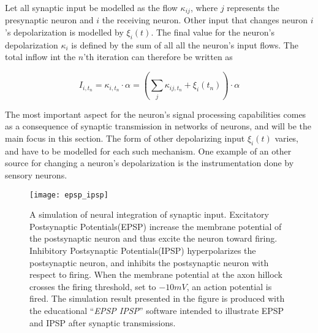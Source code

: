 	Let all synaptic input be modelled as the flow $\kappa_{ij}$, where $j$ represents the presynaptic neuron and $i$ the receiving neuron.
	Other input that changes neuron $i$'s depolarization is modelled by $\xi_i(t)$.
	The final value for the neuron's depolarization $\kappa_i$ is defined by the sum of all all the neuron's input flows.
	The total inflow int the $n$'th iteration can therefore be written as

		\begin{equation}
			I_{i, t_n} = \kappa_{i,t_n} \cdot \alpha = \left( \sum_{j} \kappa_{ij, t_n} + \xi_i(t_n) \right) \cdot \alpha
			\label{eqSynapticIntegrationForKANN}
		\end{equation}

	The most important aspect for the neuron's signal processing capabilities comes as a consequence of synaptic transmission in networks of neurons, and will be the main focus in this section.
	The form of other depolarizing input $\xi_i(t)$ varies, and have to be modelled for each such mechanism. %
	One example of an other source for changing a neuron's depolarization is the instrumentation done by sensory neurons. %

\begin{figure}[hbt!p]
	\centering
	\texttt{[image: epsp\_ipsp]}
	\caption{A simulation of neural integration of synaptic input. 
			Excitatory Postsynaptic Potentials(EPSP) increase the membrane potential of the postsynaptic neuron and thus excite the neuron toward firing.
			Inhibitory Postsynaptic Potentials(IPSP) hyperpolarizes the postsynaptic neuron, and inhibits the postsynaptic neuron with respect to firing.
			When the membrane potential at the axon hillock crosses the firing threshold, set to $-10mV$, an action potential is fired.
			The simulation result presented in the figure is produced with the educational ``\emph{EPSP IPSP}'' software intended to illustrate EPSP and IPSP after synaptic transmissions.
				}
	\label{figFigurAvNeuronet}
\end{figure}


